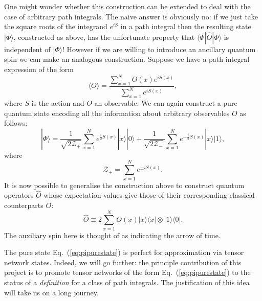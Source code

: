 \documentclass[twocolumn,lengthcheck,superscriptaddress]{revtex4-1}
\theoremstyle{definition}
\theoremstyle{remark}
\begin{document}
One might wonder whether this construction can be extended to deal with the case of arbitrary path integrals. The naive answer is obviously no: if we just take the square roots of the integrand $e^{iS}$ in a path integral then the resulting state $|\Phi\rangle$, constructed as above, has the unfortunate property that $\langle \Phi| \widehat{O}|\Phi\rangle$ is independent of $|\Phi\rangle$! However if we are willing to introduce an ancillary quantum spin we can make an analogous construction. Suppose we have a path integral expression of the form 
\begin{equation}
	\langle O \rangle = \frac{\sum_{x=1}^N O(x) e^{iS(x)}}{\sum_{x=1}^N e^{iS(x)}},
\end{equation}
where $S$ is the action and $O$ an observable. We can again construct a pure quantum state encoding all the information about arbitrary observables $O$ as follows:
\begin{equation}\label{eq:pipurestate}
	|\Phi\rangle = \frac{1}{\sqrt{2\mathcal{Z_+}}}\sum_{x=1}^N e^{\frac{i}{2}S(x)} |x\rangle|0\rangle + \frac{1}{\sqrt{2\mathcal{Z_-}}}\sum_{x=1}^N e^{-\frac{i}{2}S(x)} |x\rangle|1\rangle,
\end{equation}
where
\begin{equation}
	\mathcal{Z_\pm} = \sum_{x=1}^N e^{\pm iS(x)}.
\end{equation}
It is now possible to generalise the construction above to construct quantum operators $\widehat{O}$ whose expectation values give those of their corresponding classical counterparts $O$:
\begin{equation}
	\widehat{O} \equiv 2\sum_{x=1}^N O(x) |x\rangle\langle x|\otimes |1\rangle\langle 0|.
\end{equation}
The auxiliary spin here is thought of as indicating the arrow of time.

The pure state Eq.~(\ref{eq:pipurestate}) is perfect for approximation via tensor network states. Indeed, we will go further: the principle contribution of this project is to promote tensor networks of the form Eq.~(\ref{eq:pipurestate}) to the status of a \emph{definition} for a class of path integrals. The justification of this idea will take us on a long journey.
\end{document}
